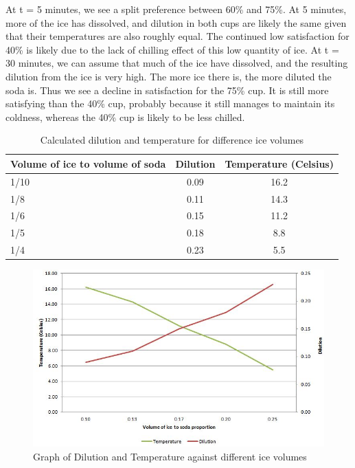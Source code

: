 \documentclass[oneside,12pt]{report}
\begin{document}
At t = 5 minutes, we see a split preference between 60\% and 75\%. At 5 minutes, more of the ice has dissolved, and dilution in both cups are likely the same given that their temperatures are also roughly equal. The continued low satisfaction for 40\% is likely due to the lack of chilling effect of this low quantity of ice.
\vspace{12pt}
\newline
At t = 30 minutes, we can assume that much of the ice have dissolved, and the resulting dilution from the ice is very high. The more ice there is, the more diluted the soda is. Thus we see a decline in satisfaction for the 75\% cup. It is still more satisfying than the 40\% cup, probably because it still manages to maintain its coldness, whereas the 40\% cup is likely to be less chilled. 


\newpage


\begin{table}[ h]
\centering
\begin{tabular}{ l || c|c}
 Volume of ice to volume of soda &Dilution &Temperature (Celsius) \\
\hline  
1/10 & 0.09&16.2\\ 
\hline  
1/8 & 0.11&14.3\\ 
\hline 
1/6 & 0.15&11.2\\ 
\hline 
1/5 & 0.18&8.8\\ 
\hline 
1/4 & 0.23&5.5\\ 
\hline    
\end{tabular}
\caption{Calculated dilution and temperature for difference ice volumes}
\end{table}

\begin{figure}
	\centering
	\caption{Graph of Dilution and Temperature against different ice volumes}
	\includegraphics[width=\textwidth]{extra/Graph.jpg}
\end{figure}
\end{document}

